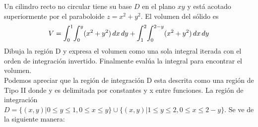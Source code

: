 \documentclass[12pt]{exam}
\begin{document}
\begin{questions}
    \question 
    Un cilindro recto no circular tiene su base $D$ en el plano $xy$ y está acotado superiormente por el paraboloide $z=x^2+y^2$. El volumen del sólido es $$V=\mathlarger{\int}_0^1\mathlarger{\int}_0^{y}(x^2+y^2)\,dx\,dy + \mathlarger{\int}_1^2\mathlarger{\int}_0^{2-y}(x^2+y^2)\,dx\,dy$$ 
    Dibuja la región D y expresa el volumen como una sola integral iterada con el orden de integración invertido. Finalmente evalúa la integral para encontrar el volumen.    \\
    Podemos apreciar que la región de integración D esta descrita como una región de Tipo II donde y es delimitada por constantes y x entre funciones. La región de integración  $D =\{(x,y)| 0\leq y \leq 1, 0 \leq x \leq y\} \cup \{(x,y)| 1 \leq y \leq 2, 0 \leq x \leq 2-y\} $. Se ve de la siguiente manera: \\
    

\end{questions}
\end{document}
